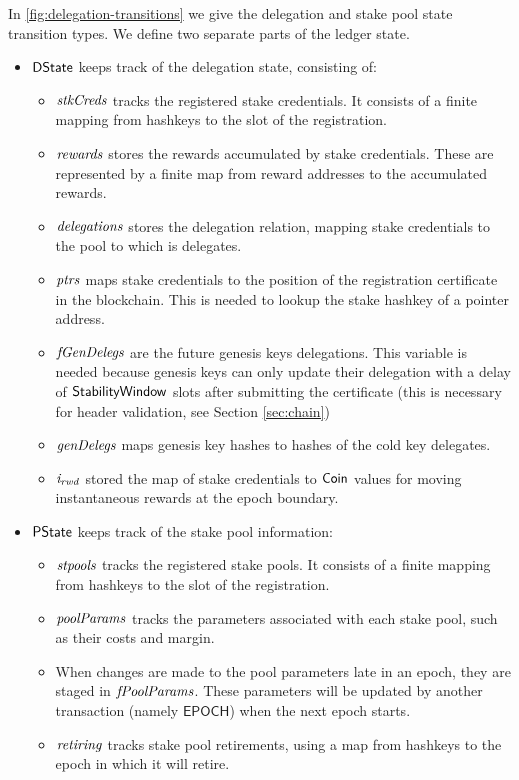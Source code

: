 In \cref{fig:delegation-transitions} we give the delegation and stake pool
state transition types. We define two separate parts of the ledger state.

\begin{itemize}
  \item $\mathsf{DState}$ keeps track of the delegation state, consisting of:
    \begin{itemize}
    \item $\mathit{stkCreds}$ tracks the registered stake credentials. It consists
      of a finite mapping from hashkeys to the slot of the registration.
    \item $\mathit{rewards}$ stores the rewards accumulated by stake credentials.
      These are represented by a finite map from reward addresses to the
      accumulated rewards.
    \item $\mathit{delegations}$ stores the delegation relation, mapping stake
      credentials to the pool to which is delegates.
    \item $\mathit{ptrs}$ maps stake credentials to the position of the
      registration certificate in the blockchain. This is needed to lookup the
      stake hashkey of a pointer address.
      \item $\mathit{fGenDelegs}$ are the future genesis keys delegations. This variable
      is needed because genesis keys can only update their delegation with a
      delay of $\mathsf{StabilityWindow}$ slots after submitting the certificate (this is
      necessary for header validation, see Section \ref{sec:chain})
      \item $\mathit{genDelegs}$ maps genesis key hashes to hashes of the cold key
        delegates.
      \item $\mathit{i_{rwd}}$ stored the map of stake credentials to $\mathsf{Coin}$
        values for moving instantaneous rewards at the epoch boundary.
    \end{itemize}
  \item $\mathsf{PState}$ keeps track of the stake pool information:
    \begin{itemize}
      \item $\mathit{stpools}$ tracks the registered stake pools. It consists of a finite
        mapping from hashkeys to the slot of the registration.
      \item $\mathit{poolParams}$ tracks the parameters associated with each stake pool, such as
        their costs and margin.
      \item When changes are made to the pool parameters late in an epoch, they are staged
        in $\mathit{fPoolParams}$.
        These parameters will be updated by another transaction (namely $\mathsf{EPOCH}$)
        when the next epoch starts.
      \item $\mathit{retiring}$ tracks stake pool retirements, using a map from hashkeys to
        the epoch in which it will retire.
    \end{itemize}
\end{itemize}


